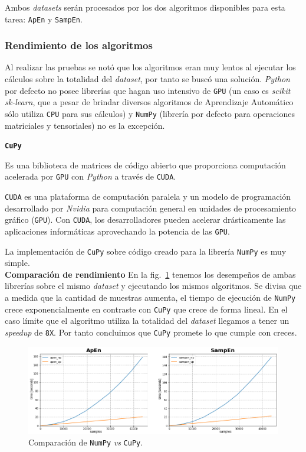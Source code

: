 \documentclass[a4paper,12pt]{article}
\begin{document}
Ambos \textit{datasets} serán procesados por los dos algoritmos disponibles para esta tarea: \texttt{ApEn} y \texttt{SampEn}.

\subsubsection{Rendimiento de los algoritmos}
Al realizar las pruebas se notó que los algoritmos eran muy lentos al ejecutar los cálculos sobre la totalidad del \textit{dataset}, por tanto se buscó una solución. \textit{Python} por defecto no posee librerías que hagan uso intensivo de \texttt{GPU} (un caso es \textit{scikit sk-learn}, que a pesar de brindar diversos algoritmos de Aprendizaje Automático sólo utiliza \texttt{CPU} para sus cálculos) y \texttt{NumPy} (librería por defecto para operaciones matriciales y tensoriales) no es la excepción.

\vfill
\textbf{\texttt{CuPy}}

Es una biblioteca de matrices de código abierto que proporciona computación acelerada por \texttt{GPU} con \textit{Python} a través de \texttt{CUDA}. \citep{CuPy} 

\texttt{CUDA} es una plataforma de computación paralela y un modelo de programación desarrollado por \textit{Nvidia} para computación general en unidades de procesamiento gráfico (\texttt{GPU}). Con \texttt{CUDA}, los desarrolladores pueden acelerar drásticamente las aplicaciones informáticas aprovechando la potencia de las \texttt{GPU}. \citep{CUDA}

La implementación de \texttt{CuPy} sobre código creado para la librería \texttt{NumPy} es muy simple.\\

\textbf{Comparación de rendimiento}
En la fig.~\ref{fig:np_vs_cp} tenemos los desempeños de ambas librerías sobre el mismo \textit{dataset} y ejecutando los mismos algoritmos. Se divisa que a medida que la cantidad de muestras aumenta, el tiempo de ejecución de \texttt{NumPy} crece exponencialmente en contraste con \texttt{CuPy} que crece de forma lineal. En el caso límite que el algoritmo utiliza la totalidad del \textit{dataset} llegamos a tener un \textit{speedup} de \texttt{8X}. Por tanto concluimos que \texttt{CuPy} promete lo que cumple con creces.

\begin{figure}[H]
	\begin{center}
	\includegraphics[width=1\textwidth]{numpy_vs_cupy.png}
  	\caption{Comparación de \texttt{NumPy} \textit{vs} \texttt{CuPy}.}
  	\label{fig:np_vs_cp}
  	\end{center}
\end{figure}
\end{document}
